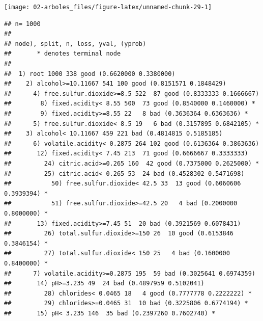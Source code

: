 \documentclass[]{book}
\newenvironment{Shaded}{\begin{snugshade}}{\end{snugshade}}
\newcommand{\KeywordTok}[1]{\textcolor[rgb]{0.13,0.29,0.53}{\textbf{#1}}}
\newcommand{\DataTypeTok}[1]{\textcolor[rgb]{0.13,0.29,0.53}{#1}}
\newcommand{\StringTok}[1]{\textcolor[rgb]{0.31,0.60,0.02}{#1}}
\newcommand{\OperatorTok}[1]{\textcolor[rgb]{0.81,0.36,0.00}{\textbf{#1}}}
\newcommand{\NormalTok}[1]{#1}
\theoremstyle{break}
\theoremstyle{definition}
\theoremstyle{definition}
\theoremstyle{definition}
\theoremstyle{remark}
\begin{document}
\begin{center}\texttt{[image: 02-arboles\_files/figure-latex/unnamed-chunk-29-1]} \end{center}

\begin{Shaded}
\end{Shaded}

\begin{verbatim}
## n= 1000 
## 
## node), split, n, loss, yval, (yprob)
##       * denotes terminal node
## 
##  1) root 1000 338 good (0.6620000 0.3380000)  
##    2) alcohol>=10.11667 541 100 good (0.8151571 0.1848429)  
##      4) free.sulfur.dioxide>=8.5 522  87 good (0.8333333 0.1666667)  
##        8) fixed.acidity< 8.55 500  73 good (0.8540000 0.1460000) *
##        9) fixed.acidity>=8.55 22   8 bad (0.3636364 0.6363636) *
##      5) free.sulfur.dioxide< 8.5 19   6 bad (0.3157895 0.6842105) *
##    3) alcohol< 10.11667 459 221 bad (0.4814815 0.5185185)  
##      6) volatile.acidity< 0.2875 264 102 good (0.6136364 0.3863636)  
##       12) fixed.acidity< 7.45 213  71 good (0.6666667 0.3333333)  
##         24) citric.acid>=0.265 160  42 good (0.7375000 0.2625000) *
##         25) citric.acid< 0.265 53  24 bad (0.4528302 0.5471698)  
##           50) free.sulfur.dioxide< 42.5 33  13 good (0.6060606 0.3939394) *
##           51) free.sulfur.dioxide>=42.5 20   4 bad (0.2000000 0.8000000) *
##       13) fixed.acidity>=7.45 51  20 bad (0.3921569 0.6078431)  
##         26) total.sulfur.dioxide>=150 26  10 good (0.6153846 0.3846154) *
##         27) total.sulfur.dioxide< 150 25   4 bad (0.1600000 0.8400000) *
##      7) volatile.acidity>=0.2875 195  59 bad (0.3025641 0.6974359)  
##       14) pH>=3.235 49  24 bad (0.4897959 0.5102041)  
##         28) chlorides< 0.0465 18   4 good (0.7777778 0.2222222) *
##         29) chlorides>=0.0465 31  10 bad (0.3225806 0.6774194) *
##       15) pH< 3.235 146  35 bad (0.2397260 0.7602740) *
\end{verbatim}

\begin{Shaded}
\end{Shaded}
\end{document}
